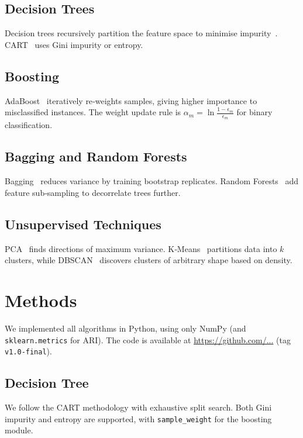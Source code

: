 \documentclass[conference]{IEEEtran}
\begin{document}
\subsection{Decision Trees}
Decision trees recursively partition the feature space to minimise
impurity~\cite{hastie2009elements}.  CART~\cite{quinlan1986induction}
uses Gini impurity or entropy.

\subsection{Boosting}
AdaBoost~\cite{freund1997decision} iteratively re‑weights samples,
giving higher importance to misclassified instances.  The weight
update rule is $\alpha_m = \ln\frac{1-\epsilon_m}{\epsilon_m}$ for
binary classification.

\subsection{Bagging and Random Forests}
Bagging~\cite{breiman1996bagging} reduces variance by training
bootstrap replicates.  Random Forests~\cite{breiman2001random} add
feature sub‑sampling to decorrelate trees further.

\subsection{Unsupervised Techniques}
PCA~\cite{pearson1901lines} finds directions of maximum variance.
K‑Means~\cite{lloyd1982least} partitions data into $k$ clusters,
while DBSCAN~\cite{ester1996density} discovers clusters of arbitrary
shape based on density.

\section{Methods}
\label{sec:methods}
We implemented all algorithms in Python, using only NumPy (and
\texttt{sklearn.metrics} for ARI).  The code is available at
\url{https://github.com/...} (tag \texttt{v1.0‑final}).

\subsection{Decision Tree}
We follow the CART methodology with exhaustive split search.
Both Gini impurity and entropy are supported, with \texttt{sample\_weight}
for the boosting module.
\end{document}
